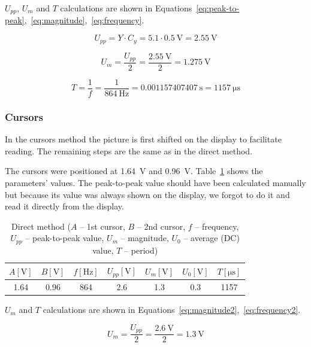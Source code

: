 $U_{pp}$, $U_{m}$ and $T$ calculations are shown in Equations~\ref{eq:peak-to-peak},~\ref{eq:magnitude},~\ref{eq:frequency}.


\begin{equation}
	U_{pp} = Y\cdot C_{y} = 5.1\cdot \SI{0.5}{\volt} = \SI{2.55}{\volt}
	\label{eq:peak-to-peak}
\end{equation}

\begin{equation}
	U_{m} = \frac{U_{pp}}{2} = \frac{\SI{2.55}{\volt}}{2} = \SI{1.275}{\volt}
	\label{eq:magnitude}
\end{equation}

\begin{equation}
	T = \frac{1}{f} = \frac{1}{\SI{864}{\hertz}} = \SI{0.001157407407}{\second} = \SI{1157}{\micro\second}
	\label{eq:frequency}
\end{equation}

\subsubsection*{Cursors}

In the cursors method the picture is first shifted on the display to facilitate reading. The remaining steps are the same as in the direct method.

The cursors were positioned at \SI{1.64}{\volt} and \SI{0.96}{\volt}. Table~\ref{tab:cursors-method} shows the parameters' values. The peak-to-peak value should have been calculated manually but because its value was always shown on the display, we forgot to do it and read it directly from the display.

\begin{table}[H]
	\centering
	\begin{tabular}{c|c|c|c|c|c|c}
		$A [\unit\volt]$ & $B [\unit\volt]$ & $f [\unit{\hertz}]$ & $U_{pp} [\unit{\volt}]$ & $U_{m} [\unit{\volt}]$ & $U_{0} [\unit{\volt}]$ & $T [\unit{\micro\second}]$\\
		\hline
		1.64 & 0.96 & 864 & 2.6 & 1.3 & 0.3 & 1157
	\end{tabular}
	\caption{Direct method ($A$ -- 1st cursor, $B$ -- 2nd cursor, $f$ -- frequency, $U_{pp}$ -- peak-to-peak value, $U_{m}$ -- magnitude, $U_{0}$ -- average (DC) value, $T$ -- period)}
	\label{tab:cursors-method}
\end{table}

$U_{m}$ and $T$ calculations are shown in Equations~\ref{eq:magnitude2},~\ref{eq:frequency2}.

\begin{equation}
	U_{m} = \frac{U_{pp}}{2} = \frac{\SI{2.6}{\volt}}{2} = \SI{1.3}{\volt}
	\label{eq:magnitude2}
\end{equation}

